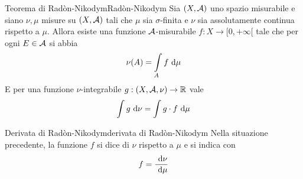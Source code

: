 \documentclass[openany]{book}
\begin{document}
\begin{theorem}{Teorema di Radòn-Nikodym}{Radòn-Nikodym}
    Sia $(X,\mathcal{A})$ uno spazio misurabile e siano $\nu, \mu$ misure su $(X,\mathcal{A})$ tali che $\mu$ sia $\sigma$-finita e $\nu$ sia assolutamente continua rispetto a $\mu$. Allora esiste una funzione $\mathcal{A}$-misurabile $f: X \to [0,+\infty[$ tale che per ogni $E \in \mathcal{A}$ si abbia
    \[\nu(A) = \intop_A f \de \mu \]
    E per una funzione $\nu$-integrabile $g : (X,\mathcal{A},\nu)\to \mathbb{R}$ vale
    \[\intop g \de \nu = \intop g \cdot f \de \mu\]
\end{theorem}
\begin{definition}{Derivata di Radòn-Nikodym}{derivata di Radòn-Nikodym}
    Nella situazione precedente, la funzione $f$ si dice  di $\nu$ rispetto a $\mu$ e si indica con
    \[f = \frac{\text{ d} \nu}{\text{ d} \mu}\]
\end{definition}

\end{document}
